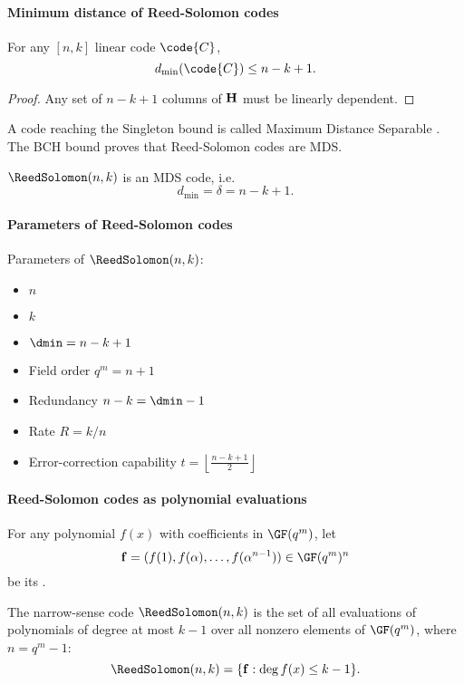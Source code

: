 \documentclass[a4paper, 11pt, openany]{book}
\begin{document}
\paragraph{Minimum distance of Reed-Solomon codes}

\begin{theorem} For any $[n,k]$ linear code $\code{C}$,
\[
	d_{\min}(\code{C}) \le n-k+1.
\]
\end{theorem}

\begin{proof}
Any set of $n-k+1$ columns of ${\bf H}$ must be linearly dependent.
\end{proof}

A code reaching the Singleton bound is called Maximum Distance Separable . The BCH bound proves that Reed-Solomon codes are MDS.

\begin{theorem}
$\ReedSolomon(n,k)$ is an MDS code, i.e.
\[
	d_{\min} = \delta = n - k +1.
\]
\end{theorem}

\paragraph{Parameters of Reed-Solomon codes}
Parameters of $\ReedSolomon(n,k)$:
\begin{itemize}
	\item {} $n$
	\item {} $k$
	\item {} $\dmin = n - k + 1$
    \item Field order $q^m = n + 1$
	\item Redundancy $n-k = \dmin - 1$
	\item Rate $R = k/n$
	\item Error-correction capability $t = \left\lfloor \frac{n-k+1}{2} \right\rfloor$
\end{itemize}

\paragraph{Reed-Solomon codes as polynomial evaluations}

For any polynomial $f(x)$ with coefficients in $\GF(q^m)$, let
\[
    {\bf f} = (f(1), f(\alpha), \ldots, f(\alpha^{n-1})) \in \GF(q^m)^n
\]
be its .

\begin{theorem}
The narrow-sense code $\ReedSolomon(n,k)$ is the set of all evaluations of polynomials of degree at most $k-1$ over all nonzero elements of $\GF(q^m)$, where $n=q^m-1$:
\[
	\ReedSolomon(n,k) = \{{\bf f} : \deg f(x) \le k-1\}.
\]
\end{theorem}
\end{document}
